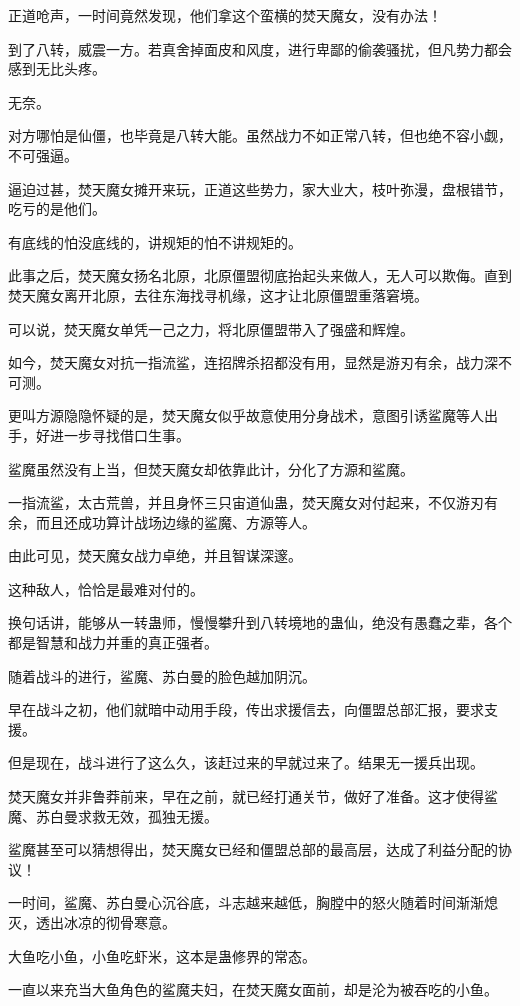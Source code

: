 \begin{this_body}
正道呛声，一时间竟然发现，他们拿这个蛮横的焚天魔女，没有办法！

到了八转，威震一方。若真舍掉面皮和风度，进行卑鄙的偷袭骚扰，但凡势力都会感到无比头疼。

无奈。

对方哪怕是仙僵，也毕竟是八转大能。虽然战力不如正常八转，但也绝不容小觑，不可强逼。

逼迫过甚，焚天魔女摊开来玩，正道这些势力，家大业大，枝叶弥漫，盘根错节，吃亏的是他们。

有底线的怕没底线的，讲规矩的怕不讲规矩的。

此事之后，焚天魔女扬名北原，北原僵盟彻底抬起头来做人，无人可以欺侮。直到焚天魔女离开北原，去往东海找寻机缘，这才让北原僵盟重落窘境。

可以说，焚天魔女单凭一己之力，将北原僵盟带入了强盛和辉煌。

如今，焚天魔女对抗一指流鲨，连招牌杀招都没有用，显然是游刃有余，战力深不可测。

更叫方源隐隐怀疑的是，焚天魔女似乎故意使用分身战术，意图引诱鲨魔等人出手，好进一步寻找借口生事。

鲨魔虽然没有上当，但焚天魔女却依靠此计，分化了方源和鲨魔。

一指流鲨，太古荒兽，并且身怀三只宙道仙蛊，焚天魔女对付起来，不仅游刃有余，而且还成功算计战场边缘的鲨魔、方源等人。

由此可见，焚天魔女战力卓绝，并且智谋深邃。

这种敌人，恰恰是最难对付的。

换句话讲，能够从一转蛊师，慢慢攀升到八转境地的蛊仙，绝没有愚蠢之辈，各个都是智慧和战力并重的真正强者。

随着战斗的进行，鲨魔、苏白曼的脸色越加阴沉。

早在战斗之初，他们就暗中动用手段，传出求援信去，向僵盟总部汇报，要求支援。

但是现在，战斗进行了这么久，该赶过来的早就过来了。结果无一援兵出现。

焚天魔女并非鲁莽前来，早在之前，就已经打通关节，做好了准备。这才使得鲨魔、苏白曼求救无效，孤独无援。

鲨魔甚至可以猜想得出，焚天魔女已经和僵盟总部的最高层，达成了利益分配的协议！

一时间，鲨魔、苏白曼心沉谷底，斗志越来越低，胸膛中的怒火随着时间渐渐熄灭，透出冰凉的彻骨寒意。

大鱼吃小鱼，小鱼吃虾米，这本是蛊修界的常态。

一直以来充当大鱼角色的鲨魔夫妇，在焚天魔女面前，却是沦为被吞吃的小鱼。


\end{this_body}

